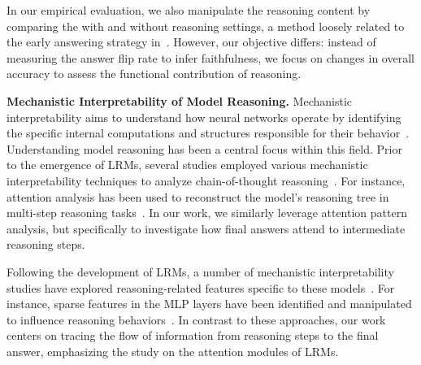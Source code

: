 \documentclass[11pt]{article}
\begin{document}
In our empirical evaluation, we also manipulate the reasoning content by comparing the with and without reasoning settings, a method loosely related to the early answering strategy in~\cite{lanham2023measuringfaithfulnesschainofthoughtreasoning}. However, our objective differs: instead of measuring the answer flip rate to infer faithfulness, we focus on changes in overall accuracy to assess the functional contribution of reasoning.


\noindent \textbf{Mechanistic Interpretability of Model Reasoning.} Mechanistic interpretability aims to understand how neural networks operate by identifying the specific internal computations and structures responsible for their behavior~\cite{olah2020zoom, meng2022locating, NEURIPS2021_4f5c422f, geva2021transformerfeedforwardlayerskeyvalue, bereska_mechanistic_2024, mueller2025questrightmediatorsurveying}. Understanding model reasoning has been a central focus within this field. Prior to the emergence of LRMs, several studies employed various mechanistic interpretability techniques to analyze chain-of-thought reasoning~\cite{NEURIPS2024_c50f8180, hou-etal-2023-towards, wang2024how, dutta2024thinkstepbystepmechanisticunderstanding, tan-2023-causal, li2024focusquestioninterpretingmitigating}. For instance, attention analysis has been used to reconstruct the model’s reasoning tree in multi-step reasoning tasks~\cite{hou-etal-2023-towards}. In our work, we similarly leverage attention pattern analysis, but specifically to investigate how final answers attend to intermediate reasoning steps.

Following the development of LRMs, a number of mechanistic interpretability studies have explored reasoning-related features specific to these models~\cite{galichin2025icoveredbaseshere, baek2025understandingdistilledreasoningmodels, GoodfireResearch, anthropic2025circuit, venhoff2025understanding}. For instance, sparse features in the MLP layers have been identified and manipulated to influence reasoning behaviors~\cite{galichin2025icoveredbaseshere}. In contrast to these approaches, our work centers on tracing the flow of information from reasoning steps to the final answer, emphasizing the study on the attention modules of LRMs.
\end{document}
